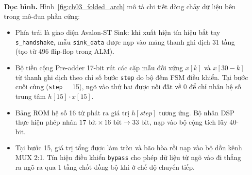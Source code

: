 \textbf{Đọc hình.} Hình~\ref{fig:ch03_folded_arch} mô tả chi tiết dòng chảy dữ liệu bên trong mô-đun phần cứng:
\begin{itemize}[leftmargin=1.5em, itemsep=2pt]
    \item Phía trái là giao diện Avalon-ST Sink: khi xuất hiện tín hiệu bắt tay \texttt{s\_handshake}, mẫu \texttt{sink\_data} được nạp vào mảng thanh ghi dịch 31 tầng (tạo từ 496 flip-flop trong ALM).
    \item Bộ tiền cộng Pre-adder 17-bit rút các cặp mẫu đối xứng $x[k]$ và $x[30-k]$ từ thanh ghi dịch theo chỉ số bước \texttt{step} do bộ đếm FSM điều khiển. Tại bước cuối cùng (\texttt{step} = 15), ngõ vào thứ hai được nối đất về 0 để chỉ nhân hệ số trung tâm $h[15] \cdot x[15]$.
    \item Bảng ROM hệ số 16 từ phát ra giá trị $h[step]$ tương ứng. Bộ nhân DSP thực hiện phép nhân $17\text{ bit} \times 16\text{ bit} \to 33\text{ bit}$, nạp vào bộ cộng tích lũy 40-bit.
    \item Tại bước 15, giá trị tổng được làm tròn và bão hòa rồi nạp vào bộ dồn kênh MUX 2:1. Tín hiệu điều khiển \texttt{bypass} cho phép dữ liệu từ ngõ vào đi thẳng ra ngõ ra qua 1 tầng chốt đồng bộ khi ở chế độ chuyển tiếp.
\end{itemize}

